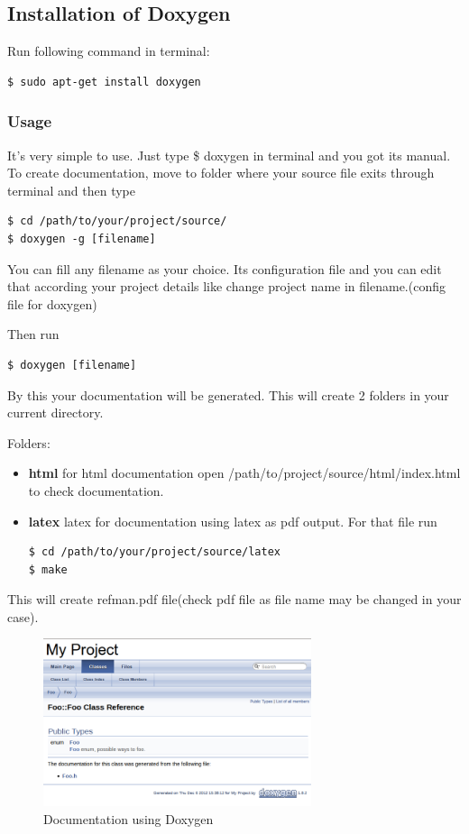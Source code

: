 \subsection{Installation of Doxygen}
Run following command in terminal:
\begin{verbatim}
$ sudo apt-get install doxygen
\end{verbatim}

\subsubsection{Usage}
It’s very simple to use. Just type \$ doxygen in terminal and you got
its manual.\\
To create documentation, move to folder where your source file exits
through terminal and then type
\begin{verbatim}
$ cd /path/to/your/project/source/
$ doxygen -g [filename]
\end{verbatim}

You can fill any filename as your choice. Its configuration file and
you can edit that according your project details like change project
name in filename.(config file for doxygen)

Then run

\begin{verbatim}
$ doxygen [filename]
\end{verbatim}

By this your documentation will be generated. This will create 2
folders in your current directory.

Folders: 

\begin{itemize}
\item {\bf html} for html documentation open
/path/to/project/source/html/index.html to check documentation.
\item {\bf latex} latex for documentation using latex as pdf output.
For that file run
\begin{verbatim}
$ cd /path/to/your/project/source/latex
$ make
\end{verbatim}
\end{itemize}

This will create refman.pdf file(check pdf file as file name may be
changed in your case).
\begin{figure}[!ht]
\centering
\includegraphics[width=0.7\textwidth]{images/doxygen_html.png}                   
\caption{Documentation using Doxygen}
\hspace{-1.5em}
\end{figure}
